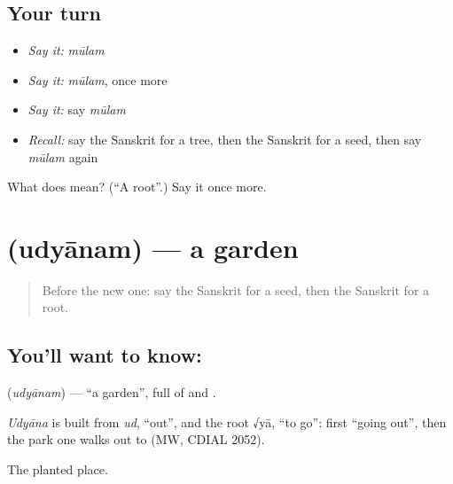 \subsection*{Your turn}
\begin{itemize}
\raggedright
  \item \emph{Say it:} \emph{mūlam}
  \item \emph{Say it:} \emph{mūlam}, once more
  \item \emph{Say it:} say \emph{mūlam}
  \item \emph{Recall:} say the Sanskrit for a tree, then the Sanskrit for a seed, then say \emph{mūlam} again
\end{itemize}

\begin{tcolorbox}[breakable,colback=teal!4,colframe=teal!35!black,title={Before you move on}]
What does  mean? (\textquotedblleft{}A root\textquotedblright{}.) Say it once more.
\end{tcolorbox}
\section[\texorpdfstring{\sk{उद्यानम्} (udyānam)}{उद्यानम् (udyānam)}]{ (udyānam) — a garden}

\label{lesson:SA-C81-garden}



\begin{quote}
Before the new one: say the Sanskrit for a seed, then the Sanskrit for a root.
\end{quote}

\subsection*{You'll want to know: }
\textbf{} (\emph{udyānam}) — \textquotedblleft{}a garden\textquotedblright{}, full of \textbf{} and \textbf{}.

\begin{cousinweb}
\emph{Udyāna} is built from \emph{ud}, \textquotedblleft{}out\textquotedblright{}, and the root √yā, \textquotedblleft{}to go\textquotedblright{}: first \textquotedblleft{}going out\textquotedblright{}, then the park one walks out to (MW, CDIAL 2052).
\end{cousinweb}

\begin{grammarlens}[title={What you've built}]
The planted place.
\end{grammarlens}

